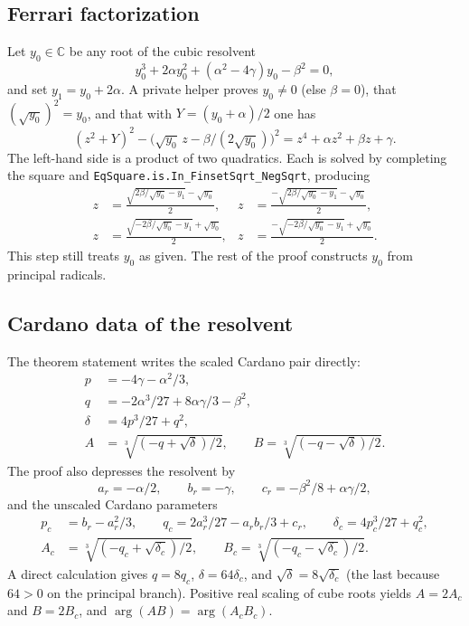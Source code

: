\documentclass[11pt,a4paper]{article}
\newcommand{\C}{\mathbb{C}}
\newcommand{\Arg}{\operatorname{arg}}
\begin{document}
\subsection{Ferrari factorization}
\label{sec:ferrari}

Let \(y_0\in\C\) be any root of the cubic resolvent
\[
y_0^3+2\alpha y_0^2+(\alpha^2-4\gamma)y_0-\beta^2=0,
\]
and set \(y_1=y_0+2\alpha\).
A private helper proves \(y_0\neq 0\) (else \(\beta=0\)), that \((\sqrt{y_0})^2=y_0\), and that with \(Y=(y_0+\alpha)/2\) one has
\[
(z^2+Y)^2-\bigl(\sqrt{y_0}\,z-\beta/(2\sqrt{y_0})\bigr)^2
=z^4+\alpha z^2+\beta z+\gamma.
\]
The left-hand side is a product of two quadratics.
Each is solved by completing the square and \texttt{EqSquare.is.In\_FinsetSqrt\_NegSqrt}, producing
\begin{align*}
z&=\frac{\sqrt{2\beta/\sqrt{y_0}-y_1}-\sqrt{y_0}}{2},&
z&=\frac{-\sqrt{2\beta/\sqrt{y_0}-y_1}-\sqrt{y_0}}{2},\\
z&=\frac{\sqrt{-2\beta/\sqrt{y_0}-y_1}+\sqrt{y_0}}{2},&
z&=\frac{-\sqrt{-2\beta/\sqrt{y_0}-y_1}+\sqrt{y_0}}{2}.
\end{align*}
This step still treats \(y_0\) as given.
The rest of the proof constructs \(y_0\) from principal radicals.

\subsection{Cardano data of the resolvent}
\label{sec:cardano}

The theorem statement writes the scaled Cardano pair directly:
\begin{align*}
p&=-4\gamma-\alpha^2/3,\\
q&=-2\alpha^3/27+8\alpha\gamma/3-\beta^2,\\
\delta&=4p^3/27+q^2,\\
A&=\sqrt[3]{(-q+\sqrt{\delta})/2},\qquad
B=\sqrt[3]{(-q-\sqrt{\delta})/2}.
\end{align*}
The proof also depresses the resolvent by
\[
a_r=-\alpha/2,\qquad b_r=-\gamma,\qquad c_r=-\beta^2/8+\alpha\gamma/2,
\]
and the unscaled Cardano parameters
\begin{align*}
p_c&=b_r-a_r^2/3,\qquad
q_c=2a_r^3/27-a_r b_r/3+c_r,\qquad
\delta_c=4p_c^3/27+q_c^2,\\
A_c&=\sqrt[3]{(-q_c+\sqrt{\delta_c})/2},\qquad
B_c=\sqrt[3]{(-q_c-\sqrt{\delta_c})/2}.
\end{align*}
A direct calculation gives \(q=8q_c\), \(\delta=64\delta_c\), and \(\sqrt{\delta}=8\sqrt{\delta_c}\) (the last because \(64>0\) on the principal branch).
Positive real scaling of cube roots yields \(A=2A_c\) and \(B=2B_c\), and \(\Arg(AB)=\Arg(A_c B_c)\).
\end{document}
